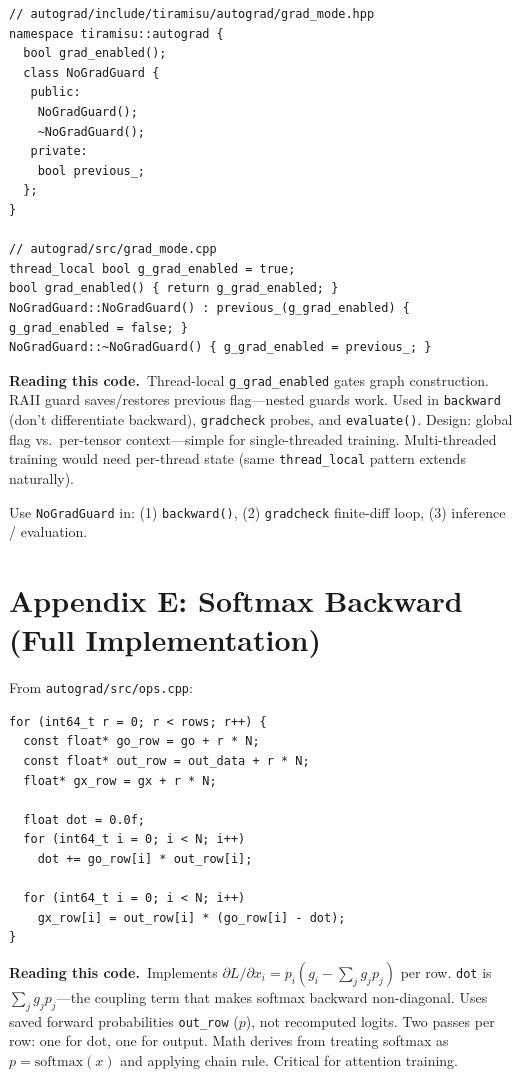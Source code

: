 \documentclass[11pt,a4paper]{article}
\newcommand{\explain}{\par\smallskip\noindent}
\newcommand{\exhead}{\textbf{Reading this code.}\ }
\begin{document}
\begin{lstlisting}[style=cpp]
// autograd/include/tiramisu/autograd/grad_mode.hpp
namespace tiramisu::autograd {
  bool grad_enabled();
  class NoGradGuard {
   public:
    NoGradGuard();
    ~NoGradGuard();
   private:
    bool previous_;
  };
}

// autograd/src/grad_mode.cpp
thread_local bool g_grad_enabled = true;
bool grad_enabled() { return g_grad_enabled; }
NoGradGuard::NoGradGuard() : previous_(g_grad_enabled) { g_grad_enabled = false; }
NoGradGuard::~NoGradGuard() { g_grad_enabled = previous_; }
\end{lstlisting}
\explain\exhead Thread-local \texttt{g\_grad\_enabled} gates graph construction. RAII guard
saves/restores previous flag---nested guards work. Used in \texttt{backward} (don't differentiate
backward), \texttt{gradcheck} probes, and \texttt{evaluate()}. Design: global flag vs.\ per-tensor
context---simple for single-threaded training. Multi-threaded training would need per-thread state
(same \texttt{thread\_local} pattern extends naturally).

Use \texttt{NoGradGuard} in: (1) \texttt{backward()}, (2) \texttt{gradcheck} finite-diff
loop, (3) inference / evaluation.

\section{Appendix E: Softmax Backward (Full Implementation)}
\label{app:softmax-bwd}

From \texttt{autograd/src/ops.cpp}:

\begin{lstlisting}[style=cpp]
for (int64_t r = 0; r < rows; r++) {
  const float* go_row = go + r * N;
  const float* out_row = out_data + r * N;
  float* gx_row = gx + r * N;

  float dot = 0.0f;
  for (int64_t i = 0; i < N; i++)
    dot += go_row[i] * out_row[i];

  for (int64_t i = 0; i < N; i++)
    gx_row[i] = out_row[i] * (go_row[i] - dot);
}
\end{lstlisting}
\explain\exhead Implements $\partial L/\partial x_i = p_i (g_i - \sum_j g_j p_j)$ per row.
\texttt{dot} is $\sum_j g_j p_j$---the coupling term that makes softmax backward non-diagonal.
Uses saved forward probabilities \texttt{out\_row} ($p$), not recomputed logits. Two passes per
row: one for dot, one for output. Math derives from treating softmax as $p = \mathrm{softmax}(x)$
and applying chain rule. Critical for attention training.
\end{document}
